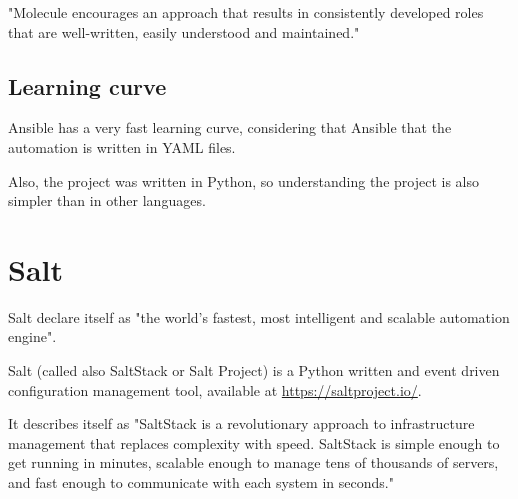 \documentclass[12pt,a4paper,openright,twoside]{book}
\begin{document}
"Molecule encourages an approach that results in consistently developed roles that are well-written, easily understood and maintained."\cite{ansibleMolecule}


\section{Learning curve}
Ansible has a very fast learning curve, considering that Ansible that the automation is written in YAML files.


Also, the project was written in Python, so understanding the project is also simpler than in other languages.






\chapter{Salt}
Salt declare itself as "the world's fastest, most intelligent and scalable automation engine"\cite{saltDocAbout}.


Salt (called also SaltStack or Salt Project) is a Python written and event driven configuration management tool, available at \url{https://saltproject.io/}.


It describes itself as "SaltStack is a revolutionary approach to infrastructure management that replaces complexity with speed. SaltStack is simple enough to get running in minutes, scalable enough to manage tens of thousands of servers, and fast enough to communicate with each system in seconds."\cite{saltDocStart}
\end{document}

